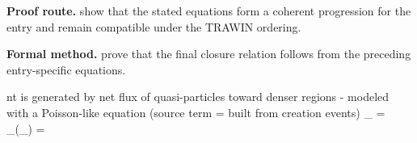 \textbf{Proof route.} show that the stated equations form a coherent progression for the entry and remain compatible under the TRAWIN ordering.

\textbf{Formal method.} prove that the final closure relation follows from the preceding entry-specific equations.

\medskip
{}

\begin{tzpsnapshot}
\end{tzpsnapshot}

\tzpequationlinks
  {nt is generated by net flux of quasi-particles toward denser regions - modeled with a Poisson-like equation (source term = built from creation events)}
  {_{} = \cdots}
  {_{}\!\left(_{}\right) = \cdots}
